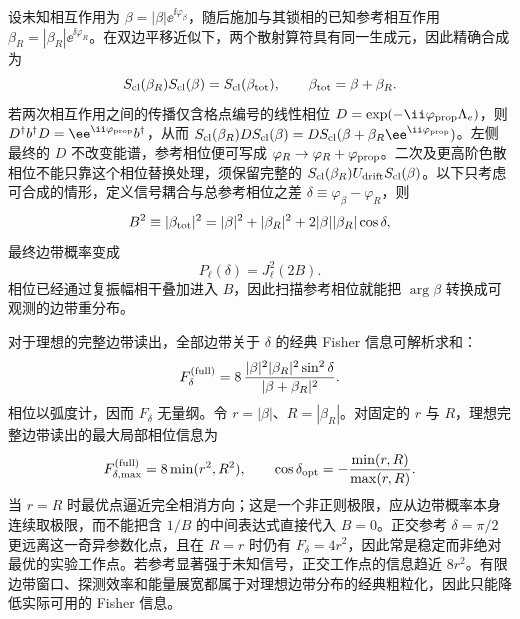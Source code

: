 设未知相互作用为 $\beta=|\beta|\ee^{\ii\varphi_\beta}$，随后施加与其锁相的已知参考相互作用 $\beta_R=|\beta_R|\ee^{\ii\varphi_R}$。在双边平移近似下，两个散射算符具有同一生成元，因此精确合成为
\begin{equation}
 {
 S_{\rm cl}(\beta_R)S_{\rm cl}(\beta)
 =S_{\rm cl}(\beta_{\rm tot}),
 \qquad
 \beta_{\rm tot}=\beta+\beta_R.}
 \label{eq:pinem-reference-composition-dp31}
\end{equation}
若两次相互作用之间的传播仅含格点编号的线性相位 $D=\exp(-\ii\varphi_{\rm prop}\Lambda_e)$，则 $D^\dagger b^\dagger D=\ee^{\ii\varphi_{\rm prop}}b^\dagger$，从而 $S_{\rm cl}(\beta_R)DS_{\rm cl}(\beta)=D S_{\rm cl}(\beta+\beta_R\ee^{\ii\varphi_{\rm prop}})$。左侧最终的 $D$ 不改变能谱，参考相位便可写成 $\varphi_R\to\varphi_R+\varphi_{\rm prop}$。二次及更高阶色散相位不能只靠这个相位替换处理，须保留完整的 $S_{\rm cl}(\beta_R)U_{\rm drift}S_{\rm cl}(\beta)$。以下只考虑可合成的情形，定义信号耦合与总参考相位之差 $\delta\equiv\varphi_\beta-\varphi_R$，则
\begin{equation*}
 B^2\equiv|\beta_{\rm tot}|^2
 =|\beta|^2+|\beta_R|^2
 +2|\beta||\beta_R|\cos\delta,
\end{equation*}
最终边带概率变成
\begin{equation}
 {P_\ell(\delta)=J_\ell^2(2B).}
 \label{eq:pinem-reference-sidebands-dp31}
\end{equation}
相位已经通过复振幅相干叠加进入 $B$，因此扫描参考相位就能把 $\arg\beta$ 转换成可观测的边带重分布。

对于理想的完整边带读出，全部边带关于 $\delta$ 的经典 Fisher 信息可解析求和：
\begin{equation}
 {
 F_\delta^{\rm(full)}
 =8\,
 \frac{|\beta|^2|\beta_R|^2\sin^2\delta}
 {|\beta+\beta_R|^2}.}
 \label{eq:pinem-reference-phase-fisher-dp31}
\end{equation}
相位以弧度计，因而 $F_\delta$ 无量纲。令 $r=|\beta|$、$R=|\beta_R|$。对固定的 $r$ 与 $R$，理想完整边带读出的最大局部相位信息为
\begin{equation}
 {
 F_{\delta,\max}^{\rm(full)}=8\min(r^2,R^2),
 \qquad
 \cos\delta_{\rm opt}
 =-\frac{\min(r,R)}{\max(r,R)}.}
 \label{eq:pinem-reference-phase-fisher-optimum-dp32}
\end{equation}
当 $r=R$ 时最优点逼近完全相消方向；这是一个非正则极限，应从边带概率本身连续取极限，而不能把含 $1/B$ 的中间表达式直接代入 $B=0$。正交参考 $\delta=\pi/2$ 更远离这一奇异参数化点，且在 $R=r$ 时仍有 $F_\delta=4r^2$，因此常是稳定而非绝对最优的实验工作点。若参考显著强于未知信号，正交工作点的信息趋近 $8r^2$。有限边带窗口、探测效率和能量展宽都属于对理想边带分布的经典粗粒化，因此只能降低实际可用的 Fisher 信息。

